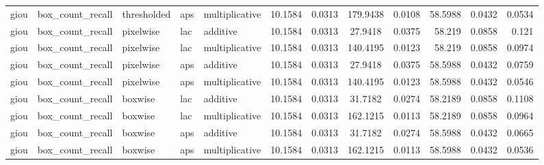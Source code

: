 \begin{table*}[htbp]
\begin{tabular}{@{}lllll rrcrrcr@{}}
giou & box\_count\_recall & thresholded & aps & multiplicative & 10.1584 & 0.0313 & 179.9438 & 0.0108 & 58.5988 & 0.0432 & 0.0534 \\
giou & box\_count\_recall & pixelwise & lac & additive & 10.1584 & 0.0313 & 27.9418 & 0.0375 & 58.219 & 0.0858 & 0.121 \\
giou & box\_count\_recall & pixelwise & lac & multiplicative & 10.1584 & 0.0313 & 140.4195 & 0.0123 & 58.219 & 0.0858 & 0.0974 \\
giou & box\_count\_recall & pixelwise & aps & additive & 10.1584 & 0.0313 & 27.9418 & 0.0375 & 58.5988 & 0.0432 & 0.0759 \\
giou & box\_count\_recall & pixelwise & aps & multiplicative & 10.1584 & 0.0313 & 140.4195 & 0.0123 & 58.5988 & 0.0432 & 0.0546 \\
giou & box\_count\_recall & boxwise & lac & additive & 10.1584 & 0.0313 & 31.7182 & 0.0274 & 58.2189 & 0.0858 & 0.1108 \\
giou & box\_count\_recall & boxwise & lac & multiplicative & 10.1584 & 0.0313 & 162.1215 & 0.0113 & 58.2189 & 0.0858 & 0.0964 \\
giou & box\_count\_recall & boxwise & aps & additive & 10.1584 & 0.0313 & 31.7182 & 0.0274 & 58.5988 & 0.0432 & 0.0665 \\
giou & box\_count\_recall & boxwise & aps & multiplicative & 10.1584 & 0.0313 & 162.1215 & 0.0113 & 58.5988 & 0.0432 & 0.0536 \\
    \bottomrule
    \end{tabular}
    \end{table*}
    